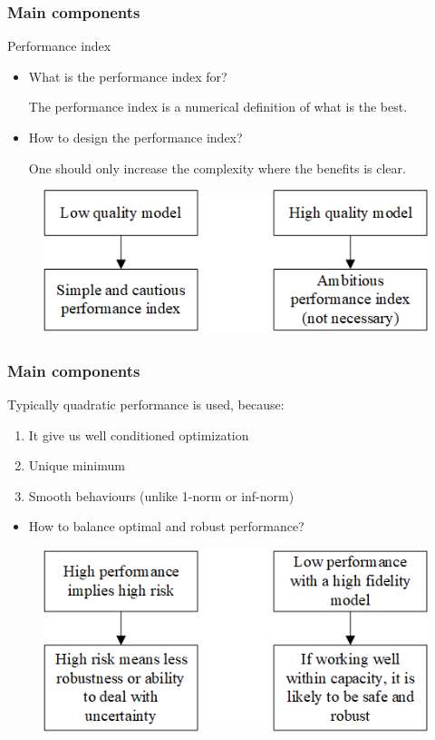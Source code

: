 \documentclass{beamer}
\begin{document}
\begin{frame}
\frametitle{Main components}
\begin{block}{Performance index}
	
\end{block}

\begin{itemize}
	\item What is the performance index for?
	
	The performance index is a numerical definition of what is the best.
	
	\item How to design the performance index?
	
	One should only increase the complexity where the benefits is clear.
\end{itemize}


\begin{figure}
	\includegraphics[width=0.7\linewidth]{Figures/lowandhigh}
\end{figure}


\end{frame}

\begin{frame}
\frametitle{Main components}

Typically quadratic performance is used, because:

\begin{enumerate}
	\item It give us well conditioned optimization
	
	\item Unique minimum
	
	\item Smooth behaviours (unlike 1-norm or inf-norm)
\end{enumerate}

\begin{itemize}
	\item How to balance optimal and robust performance?

\end{itemize}

\begin{figure}
	\includegraphics[width=0.7\linewidth]{Figures/lowandhigh1}
\end{figure}

\end{frame}
\end{document}
